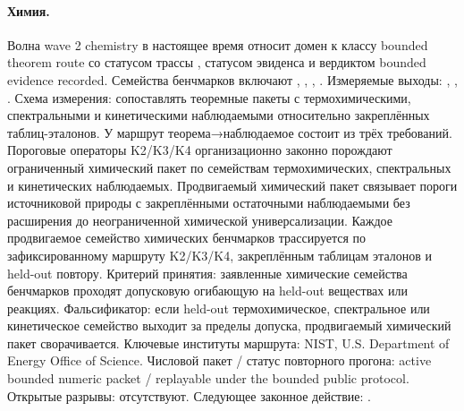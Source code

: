 \paragraph{Химия.}
Волна wave 2 chemistry в настоящее время относит домен к классу bounded theorem route со статусом трассы , статусом эвиденса  и вердиктом bounded evidence recorded.
Семейства бенчмарков включают , \allowbreak {}, \allowbreak {}, \allowbreak {}.
Измеряемые выходы: , \allowbreak {}, \allowbreak {}.
Схема измерения: сопоставлять теоремные пакеты с термохимическими, спектральными и кинетическими наблюдаемыми относительно закреплённых таблиц-эталонов.
У маршрут теорема→наблюдаемое состоит из трёх требований. Пороговые операторы K2/K3/K4 организационно законно порождают ограниченный химический пакет по семействам термохимических, спектральных и кинетических наблюдаемых. Продвигаемый химический пакет связывает пороги источниковой природы с закреплёнными остаточными наблюдаемыми без расширения до неограниченной химической универсализации. Каждое продвигаемое семейство химических бенчмарков трассируется по зафиксированному маршруту K2/K3/K4, закреплённым таблицам эталонов и held-out повтору.
Критерий принятия: заявленные химические семейства бенчмарков проходят допусковую огибающую на held-out веществах или реакциях.
Фальсификатор: если held-out термохимическое, спектральное или кинетическое семейство выходит за пределы допуска, продвигаемый химический пакет сворачивается.
Ключевые институты маршрута: NIST, \allowbreak U.S. Department of Energy Office of Science.
Числовой пакет / статус повторного прогона: active bounded numeric packet / replayable under the bounded public protocol.
Открытые разрывы: отсутствуют.
Следующее законное действие: .

